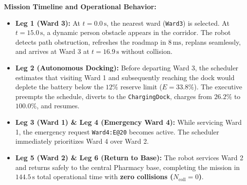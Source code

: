 \documentclass[12pt,a4paper]{article}
\begin{document}
\begin{table}[H]
\centering
\caption{Recorded Leg-by-Leg Mission Execution Metrics}
\label{tab:mission_log}
\end{table}

\textbf{Mission Timeline and Operational Behavior:}
\begin{itemize}[itemsep=2pt,topsep=2pt]
\item \textbf{Leg 1 (Ward 3):} At $t = 0.0\,\text{s}$, the nearest ward (\texttt{Ward3}) is selected. At $t = 15.0\,\text{s}$, a dynamic person obstacle appears in the corridor. The robot detects path obstruction, refreshes the roadmap in $8\,\text{ms}$, replans seamlessly, and arrives at Ward 3 at $t = 16.9\,\text{s}$ without collision.
\item \textbf{Leg 2 (Autonomous Docking):} Before departing Ward 3, the scheduler estimates that visiting Ward 1 and subsequently reaching the dock would deplete the battery below the $12\%$ reserve limit ($E = 33.8\%$). The executive preempts the schedule, diverts to the \texttt{ChargingDock}, charges from $26.2\%$ to $100.0\%$, and resumes.
\item \textbf{Leg 3 (Ward 1) \& Leg 4 (Emergency Ward 4):} While servicing Ward 1, the emergency request \texttt{Ward4:E@20} becomes active. The scheduler immediately prioritizes Ward 4 over Ward 2.
\item \textbf{Leg 5 (Ward 2) \& Leg 6 (Return to Base):} The robot services Ward 2 and returns safely to the central Pharmacy base, completing the mission in $144.5\,\text{s}$ total operational time with \textbf{zero collisions ($N_{\text{coll}} = 0$)}.
\end{itemize}
\end{document}
